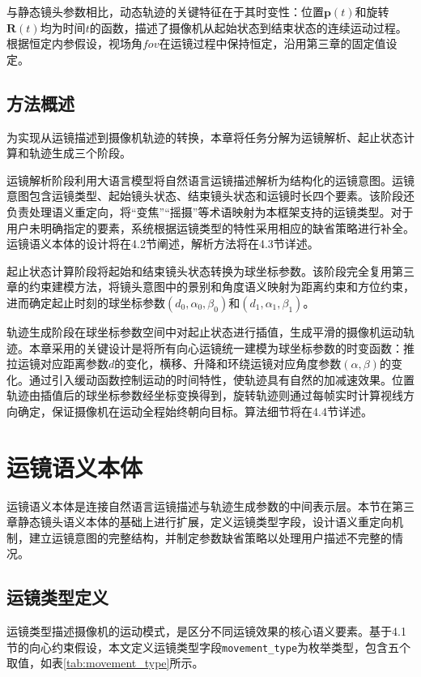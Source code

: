 与静态镜头参数相比，动态轨迹的关键特征在于其时变性：位置$\mathbf{p}(t)$和旋转$\mathbf{R}(t)$均为时间$t$的函数，描述了摄像机从起始状态到结束状态的连续运动过程。根据恒定内参假设，视场角$\textit{fov}$在运镜过程中保持恒定，沿用第三章的固定值设定。

\subsection{方法概述}

为实现从运镜描述到摄像机轨迹的转换，本章将任务分解为运镜解析、起止状态计算和轨迹生成三个阶段。

运镜解析阶段利用大语言模型将自然语言运镜描述解析为结构化的运镜意图。运镜意图包含运镜类型、起始镜头状态、结束镜头状态和运镜时长四个要素。该阶段还负责处理语义重定向，将“变焦”“摇摄”等术语映射为本框架支持的运镜类型。对于用户未明确指定的要素，系统根据运镜类型的特性采用相应的缺省策略进行补全。运镜语义本体的设计将在4.2节阐述，解析方法将在4.3节详述。

起止状态计算阶段将起始和结束镜头状态转换为球坐标参数。该阶段完全复用第三章的约束建模方法，将镜头意图中的景别和角度语义映射为距离约束和方位约束，进而确定起止时刻的球坐标参数$(d_0, \alpha_0, \beta_0)$和$(d_1, \alpha_1, \beta_1)$。

轨迹生成阶段在球坐标参数空间中对起止状态进行插值，生成平滑的摄像机运动轨迹。本章采用的关键设计是将所有向心运镜统一建模为球坐标参数的时变函数：推拉运镜对应距离参数$d$的变化，横移、升降和环绕运镜对应角度参数$(\alpha, \beta)$的变化。通过引入缓动函数控制运动的时间特性，使轨迹具有自然的加减速效果。位置轨迹由插值后的球坐标参数经坐标变换得到，旋转轨迹则通过每帧实时计算视线方向确定，保证摄像机在运动全程始终朝向目标。算法细节将在4.4节详述。

\section{运镜语义本体}

运镜语义本体是连接自然语言运镜描述与轨迹生成参数的中间表示层。本节在第三章静态镜头语义本体的基础上进行扩展，定义运镜类型字段，设计语义重定向机制，建立运镜意图的完整结构，并制定参数缺省策略以处理用户描述不完整的情况。

\subsection{运镜类型定义}

运镜类型描述摄像机的运动模式，是区分不同运镜效果的核心语义要素。基于4.1节的向心约束假设，本文定义运镜类型字段\texttt{movement\_type}为枚举类型，包含五个取值，如表\ref{tab:movement_type}所示。


